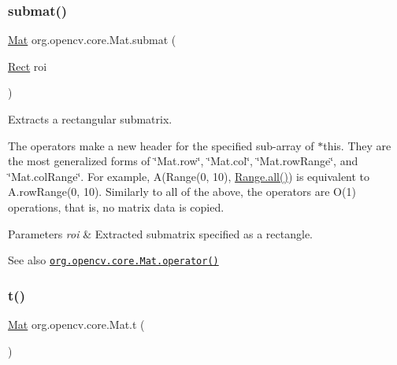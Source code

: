 \subsubsection{\texorpdfstring{submat()}{submat()}\hspace{0.1cm}{\footnotesize\ttfamily [3/3]}}
{\footnotesize\ttfamily \mbox{\hyperlink{classorg_1_1opencv_1_1core_1_1_mat}{Mat}} org.\+opencv.\+core.\+Mat.\+submat (\begin{DoxyParamCaption}\item[{\mbox{\hyperlink{classorg_1_1opencv_1_1core_1_1_rect}{Rect}}}]{roi }\end{DoxyParamCaption})}

Extracts a rectangular submatrix.

The operators make a new header for the specified sub-\/array of {\ttfamily $\ast$this}. They are the most generalized forms of \char`\"{}\+Mat.\+row\char`\"{}, \char`\"{}\+Mat.\+col\char`\"{}, \char`\"{}\+Mat.\+row\+Range\char`\"{}, and \char`\"{}\+Mat.\+col\+Range\char`\"{}. For example, {\ttfamily A(Range(0, 10), \mbox{\hyperlink{classorg_1_1opencv_1_1core_1_1_range_a2dd4a07a9715665aacee5c7cdf79a175}{Range.\+all()}})} is equivalent to {\ttfamily A.\+row\+Range(0, 10)}. Similarly to all of the above, the operators are O(1) operations, that is, no matrix data is copied.


\begin{DoxyParams}{Parameters}
{\em roi} & Extracted submatrix specified as a rectangle.\\
\hline
\end{DoxyParams}
\begin{DoxySeeAlso}{See also}
\href{http://docs.opencv.org/modules/core/doc/basic_structures.html#mat-operator}{\tt org.\+opencv.\+core.\+Mat.\+operator()} 
\end{DoxySeeAlso}
\mbox{\label{classorg_1_1opencv_1_1core_1_1_mat_a8df776cc748a0006e8837fcb7a1772f0}} 
\subsubsection{\texorpdfstring{t()}{t()}}
{\footnotesize\ttfamily \mbox{\hyperlink{classorg_1_1opencv_1_1core_1_1_mat}{Mat}} org.\+opencv.\+core.\+Mat.\+t (\begin{DoxyParamCaption}{ }\end{DoxyParamCaption})}

